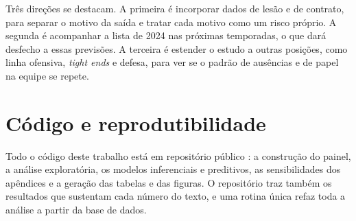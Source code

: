 Três direções se destacam. A primeira é incorporar dados de lesão e de contrato, para separar o motivo da saída e tratar cada motivo como um risco próprio. A segunda é acompanhar a lista de 2024 nas próximas temporadas, o que dará desfecho a essas previsões. A terceira é estender o estudo a outras posições, como linha ofensiva, \textit{tight ends} e defesa, para ver se o padrão de ausências e de papel na equipe se repete.

\section{Código e reprodutibilidade}
\label{sec:codigo}

Todo o código deste trabalho está em repositório público \citep{gon2026codigo}: a construção do painel, a análise exploratória, os modelos inferenciais e preditivos, as sensibilidades dos apêndices e a geração das tabelas e das figuras. O repositório traz também os resultados que sustentam cada número do texto, e uma rotina única refaz toda a análise a partir da base de dados.
